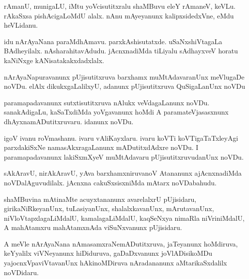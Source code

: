\documentclass{article}
\begin{document}
\begin{mn}
rAmanU,  munigaLU,  iMtu  yoVcisutitxralu  shaMBuvu  eleY  rAmaneV,  keVLu.  rAkaSxsa  pishAcigaLoMdU  alalx.  nAnu  mAyeyanunx  
kalipxsidedxVne,  eMdu  heVLidanu.
\end{mn}

\begin{mn}
idu  nArAyaNana  paraMdhAmavu.  parxkAshisutatxde.  uSaNxshiVtagaLa  BAdheyilalx.  nAsharahitavAdudu.  jAcnxnadiMda  tiLiyalu  
sAdhayxveV  horatu  kaNiNxge  kANisatakakxdadxlalx.
\end{mn}

\begin{mn}
nArAyaNapuravanunx  pUjisutitxruva  barxhamx  muMtAdavaranUnx  meVlugaDe  noVDu.  elAlx  dikukxgaLalilxyU,  adanunx  pUjisutitxruva  
QuSigaLanUnx  noVDu
\end{mn}

\begin{mn}
paramapadavanunx  sutxtisutitxruva  nAlukx  veVdagaLanunx  noVDu.  sanakAdigaLu,  kaSaTxdiMda  yoVgavanunx  hoMdi  A  paramateVjasasxnunx  
dhAyxnamADutitxruvaru.  idanunx  noVDu.
\end{mn}

\begin{mn}
igoV  ivanu  roVmashanu.  ivaru  vAliKayxlaru.  ivaru  koVTi  koVTigaTaTxleyAgi  parxdakiSxNe  namasAkxragaLanunx  mADutitxdAdxre  noVDu.  
I  paramapadavanunx  lakiSxmXyeV  muMtAdavaru  pUjisutitxruvudanUnx  noVDu.
\end{mn}

\begin{mn}
sAkAravU,  nirAkAravU,  yAva barxhamxniruvanoV  Atananunx  ajAcnxnadiMda  noVDalAguvudilalx.  jAcnxna  cakuSxsisxniMda  mAtarx  noVDabahudu.
\end{mn}

\begin{mn}
shaMBuvina  mAtinaMte  acuyxtananunx  avarelalxrU  pUjisidaru,  girikaNiRkeyanUnx,  tuLasiyanUnx,  shalalxkavanUnx,  mArutavanUnx,  
niVloVtapxlagaLiMdalU,  kamalagaLiMdalU,  kaqSeNxya  nimaRla  niVriniMdalU,  A  mahAtamxru  mahAtamxnAda  viSuNxvanunx  pUjisidaru.
\end{mn}

\begin{mn}
A meVle  nArAyaNana  nAmasamxraNemADutitxruva,  jaTeyanunx  hoMdiruva,  keYyalilx  viVNeyanunx  hiDiduruva,  gaDaDxvanunx  joVlADisikoMDu  
yajocnxVpaviVtavanUnx  hAkinoMDiruva  nAradananunx  aMtarikaSxdalilx  noVDidaru.
\end{mn}
\end{document}
